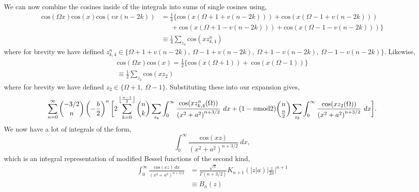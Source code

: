 We can now combine the cosines inside of the integrals into sums of single cosines using,
\begin{equation}
    \begin{aligned}
        \textrm{cos}(\Omega x) \textrm{cos}(x) \textrm{cos}(vx(n - 2k)) &=
        \frac{1}{4} \bigl\{\textrm{cos}(x(\Omega + 1 + v(n-2k)))
        +\textrm{cos}(x(\Omega - 1 + v(n-2k))) \\ 
        &\quad\ \ +\textrm{cos}(x(\Omega + 1 - v(n-2k)))
        +\textrm{cos}(x(\Omega - 1 - v(n-2k))) \bigr\} \\[1em]
        &\equiv \frac{1}{4} \sum_{z_4} \textrm{cos}(xz_{k,4}^n)
    \end{aligned}
\end{equation}
where for brevity we have defined $z_{k,4}^n \in \{\Omega + 1 + v(n-2k),\ \Omega - 1 + v(n-2k),\ \Omega + 1 - v(n-2k),\ \Omega - 1 - v(n-2k) \}$. Likewise,
\begin{equation}
    \begin{gathered}
        \textrm{cos}(\Omega x) \textrm{cos}(x) =\frac{1}{2} \bigl\{\textrm{cos}(x(\Omega + 1)) +\ \textrm{cos}(x(\Omega - 1))\bigr\} \\[1em]
        \equiv \frac{1}{2} \sum_{z_2} \textrm{cos}(xz_2)
    \end{gathered}
\end{equation}
where for brevity we have defined $z_2 \in \{\Omega + 1,\ \Omega - 1\}$. Substituting these into our expansion gives,
\begin{equation}
    \begin{aligned}
        \sum_{n=0}^\infty \binom{-3/2}{n} \left(-\frac{b}{2}\right)^n \bigg[2\sum_{k=0}^{\floor*{\frac{n-1}{2}}} \binom{n}{k} \sum_{z_4} \int_0^\infty \frac{\textrm{cos}(xz^n_{k,4}(\Omega))}{\left(x^2 + a^2\right)^{n + 3/2}}\ dx
        + (1-n\textrm{mod}2) \binom{n}{\frac{n}{2}} \sum_{z_2} \int_0^\infty \frac{ \textrm{cos}(xz_2(\Omega))}{\left(x^2 + a^2\right)^{n + 3/2}}\ dx \bigg].
    \end{aligned}
\end{equation}
We now have a lot of integrals of the form,
\begin{equation} \label{eqn: cosintegral}
    \int_0^\infty \frac{\textrm{cos}(xz)}{\left(x^2 + a^2\right)^{n + 3/2}}\ dx,
\end{equation}
which is an integral representation of modified Bessel functions of the second kind,
\begin{equation}
    \begin{aligned}
        \int_0^\infty \frac{\textrm{cos}(xz)\ dx}{\left(x^2 + a^2\right)^{n + 3/2}} &= \frac{\sqrt{\pi}}{\Gamma(n + 3/2)} K_{n+1}(|z|a) \bigg|\frac{z}{2a}\bigg|^{n + 1} \\
        &\equiv B_n(z)
    \end{aligned}
\end{equation}
